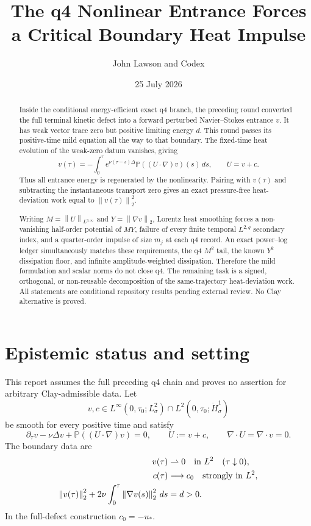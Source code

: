 \documentclass[11pt]{article}
\title{The q4 Nonlinear Entrance Forces\\
a Critical Boundary Heat Impulse}
\author{John Lawson and Codex}
\date{25 July 2026}
\theoremstyle{remark}
\newcommand{\Pp}{\mathbb P}
\newcommand{\norm}[1]{\left\|#1\right\|}
\newcommand{\weakto}{\rightharpoonup}
\begin{document}
\maketitle

\begin{abstract}
Inside the conditional energy-efficient exact q4 branch, the preceding
round converted the full terminal kinetic defect into a forward
perturbed Navier--Stokes entrance \(v\).  It has weak vector trace zero
but positive limiting energy \(d\).  This round passes its positive-time
mild equation all the way to that boundary.  The fixed-time heat
evolution of the weak-zero datum vanishes, giving
\[
 v(\tau)
 =
 -\int_0^\tau e^{\nu(\tau-s)\Delta}
 \mathbb P((U\cdot\nabla)v)(s)\,ds,
 \qquad U=v+c.
\]
Thus all entrance energy is regenerated by the nonlinearity.  Pairing
with \(v(\tau)\) and subtracting the instantaneous transport zero gives
an exact pressure-free heat-deviation work equal to
\(\norm{v(\tau)}_2^2\).

Writing \(M=\norm{U}_{L^{3,\infty}}\) and
\(Y=\norm{\nabla v}_2\), Lorentz heat smoothing forces a non-vanishing
half-order potential of \(MY\), failure of every finite temporal
\(L^{2,q}\) secondary index, and a quarter-order impulse of size
\(m_j\) at each q4 record.  An exact power--log ledger simultaneously
matches these requirements, the q4 \(M^2\) tail, the known \(Y^2\)
dissipation floor, and infinite amplitude-weighted dissipation.
Therefore the mild formulation and scalar norms do not close q4.  The
remaining task is a signed, orthogonal, or non-reusable decomposition of
the same-trajectory heat-deviation work.  All statements are conditional
repository results pending external review.  No Clay alternative is
proved.
\end{abstract}

\section{Epistemic status and setting}

This report assumes the full preceding q4 chain and proves no assertion
for arbitrary Clay-admissible data.  Let
\[
 v,c\in
 L^\infty(0,\tau_0;L^2_\sigma)
 \cap L^2(0,\tau_0;\dot H^1_\sigma)
\]
be smooth for every positive time and satisfy
\begin{equation}
\label{eq:entrance}
 \partial_\tau v-\nu\Delta v+
 \Pp((U\cdot\nabla)v)=0,
 \qquad U:=v+c,
 \qquad \nabla\cdot U=\nabla\cdot v=0.
\end{equation}
The boundary data are
\begin{align}
\label{eq:weak-zero}
 v(\tau)&\weakto0
 \quad\hbox{in }L^2
 \quad(\tau\downarrow0),\\
\label{eq:strong-c}
 c(\tau)&\longrightarrow c_0
 \quad\hbox{strongly in }L^2,\\
\label{eq:energy}
 \norm{v(\tau)}_2^2+
 2\nu\int_0^\tau\norm{\nabla v(s)}_2^2\,ds&=d>0.
\end{align}
In the full-defect construction \(c_0=-u_*\).
\end{document}

